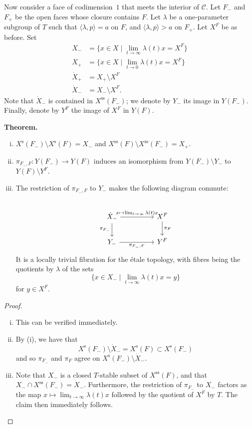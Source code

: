 \documentclass{article}
\newenvironment{itenv}[1]
  {\phantomsection\par\medskip\noindent\textbf{#1.}\itshape}
  {\par\medskip}
\newcommand{\s}{\mathrm{s}}
\renewcommand{\ss}{\mathrm{ss}}
\newcommand{\oldpage}[1]{\marginpar{\footnotesize$\Big\vert$ \textit{p.~#1}}}
\begin{document}
Now consider a face of codimension~$1$ that meets the interior of $\mathcal{C}$.
Let $F_-$ and $F_+$ be the open faces whose closure contains $F$.
Let $\lambda$ be a one-parameter subgroup of $T$ such that $\langle\lambda,p\rangle=a$ on $F$, and $\langle\lambda,p\rangle>a$ on $F_+$.
Let $X^F$ be as before.
Set
\[
  \begin{aligned}
    X_- &= \big\{x\in X\mid\lim_{t\to\infty}\lambda(t)x=X^F\big\}
  \\X_+ &= \big\{x\in X\mid\lim_{t\to0}\lambda(t)x=X^F\big\}
  \\\dot{X}_+ &= X_+\setminus X^F
  \\\dot{X}_- &= X_-\setminus X^F.
  \end{aligned}
\]
Note that $\dot{X}_-$ is contained in $X^\ss(F_-)$;
we denote by $Y_-$ its image in $Y(F_-)$.
Finally, denote by $Y^F$ the image of $X^F$ in $Y(F)$.

\oldpage{517}
\begin{itenv}{Theorem}
  \begin{enumerate}[(i)]
    \item $X^\s(F_-)\setminus X^\s(F)=X_-$ and $X^\ss(F)\setminus X^\ss(F_-)=X_+$.
    \item $\pi_{F_-,F}\colon Y(F_-)\to Y(F)$ induces an isomorphism from $Y(F_-)\setminus Y_-$ to $Y(F)\setminus Y^F$.
    \item The restriction of $\pi_{F_-,F}$ to $Y_-$ makes the following diagram commute:
      \[
        \begin{tikzcd}[column sep=huge]
        \\\dot{X}_- \rar["x\mapsto\lim_{t\to\infty}\lambda(t)x"] \dar[swap,"\pi_{F_-}"]
          & X^F \dar["\pi_F"]
        \\Y_- \rar[swap,"\pi_{F_-,F}"]
          & Y^F
        \end{tikzcd}
      \]
      It is a locally trivial fibration for the \'{e}tale topology, with fibres being the quotients by $\lambda$ of the sets
      \[
        \big\{x\in X_-\mid\lim_{t\to\infty}\lambda(t)x=y\big\}
      \]
      for $y\in X^F$.
  \end{enumerate}
\end{itenv}

\begin{proof}
  \begin{enumerate}[(i)]
    \item This can be verified immediately.
    \item By (i), we have that
      \[
        X^\s(F_-)\setminus\dot{X}_- = X^\s(F) \subset X^\s(F_-)
      \]
      and so $\pi_{F_-}$ and $\pi_F$ agree on $X^\s(F_-)\setminus\dot{X}_-$.
    \item Note that $X_-$ is a closed $T$-stable subset of $X^\ss(F)$, and that $X_-\cap X^\ss(F_-)=\dot{X}_-$.
      Furthermore, the restriction of $\pi_{F_-}$ to $X_-$ factors as the map $x\mapsto\lim_{t\to\infty}\lambda(t)x$ followed by the quotient of $X^F$ by $T$.
      The claim then immediately follows.
  \end{enumerate}
\end{proof}
\end{document}

